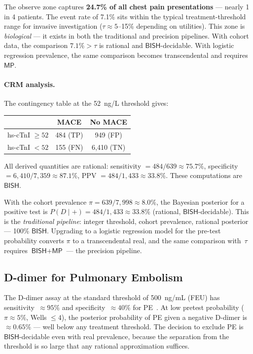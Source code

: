 \documentclass[11pt,a4paper]{article}
\theoremstyle{plain}
\theoremstyle{definition}
\newcommand{\BISH}{\textsf{BISH}}
\newcommand{\MP}{\textsf{MP}}
\begin{document}
The observe zone captures \textbf{24.7\% of all chest pain presentations} --- nearly 1 in 4 patients.  The event rate of 7.1\% sits within the typical treatment-threshold range for invasive investigation ($\tau \approx 5$--15\% depending on utilities).  This zone is \emph{biological} --- it exists in both the traditional and precision pipelines.  With cohort data, the comparison $7.1\% > \tau$ is rational and $\BISH$-decidable.  With logistic regression prevalence, the same comparison becomes transcendental and requires $\MP$.

\paragraph{CRM analysis.}  The contingency table at the 52~ng/L threshold gives:
\begin{center}
\begin{tabular}{lcc}
\toprule
& MACE & No MACE \\
\midrule
hs-cTnI $\geq 52$ & 484 (TP) & 949 (FP) \\
hs-cTnI $< 52$ & 155 (FN) & 6{,}410 (TN) \\
\bottomrule
\end{tabular}
\end{center}

All derived quantities are rational: sensitivity $= 484/639 \approx 75.7\%$, specificity $= 6{,}410/7{,}359 \approx 87.1\%$, PPV $= 484/1{,}433 \approx 33.8\%$.  These computations are $\BISH$.

With the cohort prevalence $\pi = 639/7{,}998 \approx 8.0\%$, the Bayesian posterior for a positive test is $P(D\mid+) = 484/1{,}433 \approx 33.8\%$ (rational, $\BISH$-decidable).  This is the \emph{traditional pipeline}: integer threshold, cohort prevalence, rational posterior --- 100\% $\BISH$.  Upgrading to a logistic regression model for the pre-test probability converts $\pi$ to a transcendental real, and the same comparison with~$\tau$ requires $\BISH + \MP$ --- the precision pipeline.

\subsection{D-dimer for Pulmonary Embolism}

The D-dimer assay at the standard threshold of 500~ng/mL (FEU) has sensitivity~$\approx 95\%$ and specificity~$\approx 40\%$ for PE~\cite{dinisio2007}.  At low pretest probability ($\pi \approx 5\%$, Wells $\leq 4$), the posterior probability of PE given a negative D-dimer is $\approx 0.65\%$ --- well below any treatment threshold.  The decision to exclude PE is $\BISH$-decidable even with real prevalence, because the separation from the threshold is so large that any rational approximation suffices.
\end{document}
